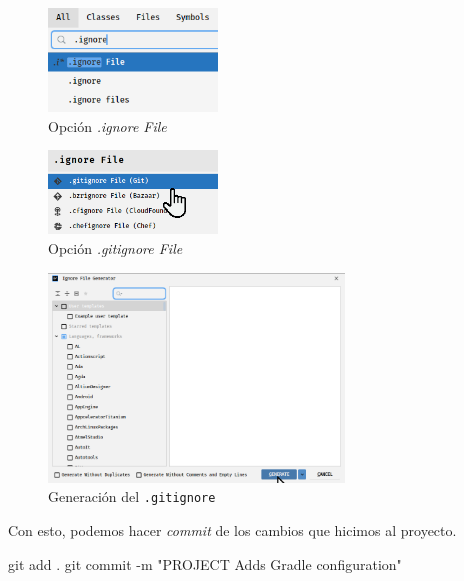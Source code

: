   \begin{figure}[ht!]
    \centering
    \includegraphics[width=0.4\textwidth]{img/oop/tdd/gradle/idea64_ignore_file.png}
    \caption{Opción \textit{.ignore File}}
    \label{fig:ignore-file}
  \end{figure}

  \begin{figure}[ht!]
    \centering
    \includegraphics[width=0.4\textwidth]{img/oop/tdd/gradle/idea64_gitignore_file.png}
    \caption{Opción \textit{.gitignore File}}
    \label{fig:gitignore}
  \end{figure}

  \begin{figure}[ht!]
    \centering
    \includegraphics[width=0.7\textwidth]{img/oop/tdd/gradle/idea64_gitignore_generate.png}
    \caption{Generación del \texttt{.gitignore}}
    \label{fig:gitignore-generate}
  \end{figure}

  Con esto, podemos hacer \textit{commit} de los cambios que hicimos al proyecto.

  \begin{powershell}
    git add .
    git commit -m "PROJECT Adds Gradle configuration"
  \end{powershell}